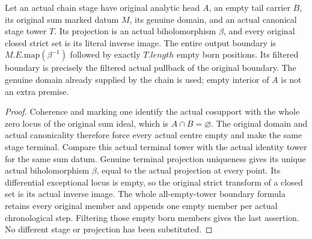 \begin{lemma}
\label{hir:original-separation-chain-empty-sum-domain-projection}
\leanok
Let an actual chain stage have original analytic head $A$, an empty
tail carrier $B$, its original sum marked datum $M$, its genuine domain,
and an actual canonical stage tower $T$. Its projection is an actual
biholomorphism $\beta$, and every original closed strict set is its
literal inverse image. The entire output boundary is
$M.E.\mathrm{map}(\beta^{-1})$ followed by exactly $T.length$ empty
born positions. Its filtered boundary is precisely the filtered actual
pullback of the original boundary. The genuine domain already supplied
by the chain is used; empty interior of $A$ is not an extra premise.
\end{lemma}
\begin{proof}
Coherence and marking one identify the actual cosupport with the whole
zero locus of the original sum ideal, which is $A\cap B=\varnothing$.
The original domain and actual canonicality therefore force every actual
centre empty and make the same stage terminal. Compare this actual
terminal tower with the actual identity tower for the same sum datum.
Genuine terminal projection uniqueness gives its unique actual
biholomorphism $\beta$, equal to the actual projection at every point.
Its differential exceptional locus is empty, so the original strict
transform of a closed set is its actual inverse image. The whole
all-empty-tower boundary formula retains every original member and
appends one empty member per actual chronological step. Filtering those
empty born members gives the last assertion. No different stage or
projection has been substituted.
\end{proof}

